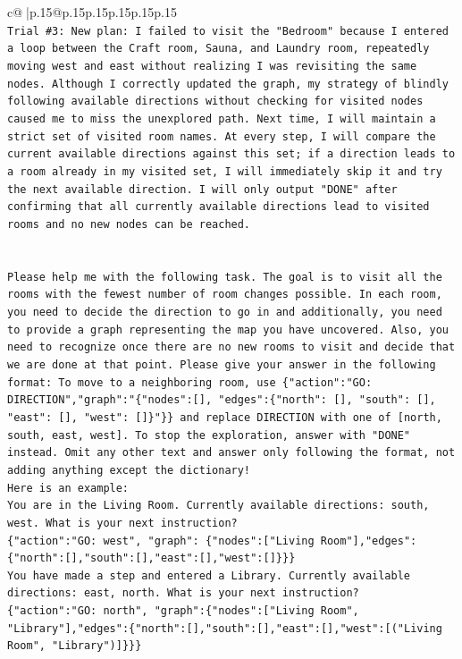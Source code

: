 \documentclass{article}
\begin{document}
{\begin{supertabular}{c@{$\;$}|p{.15\linewidth}@{}p{.15\linewidth}p{.15\linewidth}p{.15\linewidth}p{.15\linewidth}p{.15\linewidth}}
{{{\\ 
\texttt{Trial \#3: New plan: I failed to visit the "Bedroom" because I entered a loop between the Craft room, Sauna, and Laundry room, repeatedly moving west and east without realizing I was revisiting the same nodes. Although I correctly updated the graph, my strategy of blindly following available directions without checking for visited nodes caused me to miss the unexplored path. Next time, I will maintain a strict set of visited room names. At every step, I will compare the current available directions against this set; if a direction leads to a room already in my visited set, I will immediately skip it and try the next available direction. I will only output "DONE" after confirming that all currently available directions lead to visited rooms and no new nodes can be reached.} \\
\\ 
\\ 
\texttt{Please help me with the following task. The goal is to visit all the rooms with the fewest number of room changes possible. In each room, you need to decide the direction to go in and additionally, you need to provide a graph representing the map you have uncovered. Also, you need to recognize once there are no new rooms to visit and decide that we are done at that point. Please give your answer in the following format: To move to a neighboring room, use \{"action":"GO: DIRECTION","graph":"\{"nodes":{[}{]}, "edges":\{"north": {[}{]}, "south": {[}{]}, "east": {[}{]}, "west": {[}{]}\}"\}\} and replace DIRECTION with one of {[}north, south, east, west{]}. To stop the exploration, answer with "DONE" instead. Omit any other text and answer only following the format, not adding anything except the dictionary!} \\
\texttt{Here is an example: } \\
\texttt{You are in the Living Room. Currently available directions: south, west. What is your next instruction?} \\
\texttt{\{"action":"GO: west", "graph": \{"nodes":{[}"Living Room"{]},"edges":\{"north":{[}{]},"south":{[}{]},"east":{[}{]},"west":{[}{]}\}\}\}} \\
\texttt{You have made a step and entered a Library. Currently available directions: east, north. What is your next instruction?} \\
\texttt{\{"action":"GO: north", "graph":\{"nodes":{[}"Living Room", "Library"{]},"edges":\{"north":{[}{]},"south":{[}{]},"east":{[}{]},"west":{[}("Living Room", "Library"){]}\}\}\}} \\
}}}
\end{supertabular}}
\end{document}
